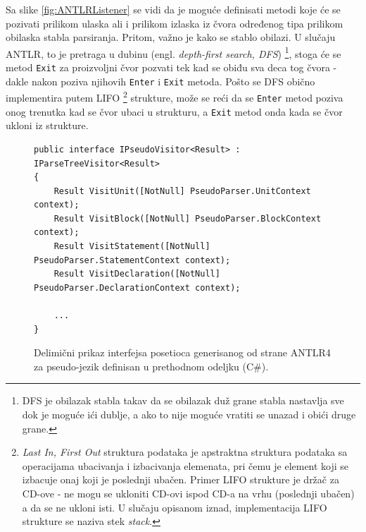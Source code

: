 Sa slike \ref{fig:ANTLRListener} se vidi da je moguće definisati metodi koje će se pozivati prilikom ulaska ali i prilikom izlaska iz čvora određenog tipa prilikom obilaska stabla parsiranja. Pritom, važno je kako se stablo obilazi. U slučaju ANTLR, to je pretraga u dubinu (engl. \emph{depth-first search, DFS}) \footnote{DFS je obilazak stabla takav da se obilazak duž grane stabla nastavlja sve dok je moguće ići dublje, a ako to nije moguće vratiti se unazad i obići druge grane.}, stoga će se metod \texttt{Exit} za proizvoljni čvor pozvati tek kad se obiđu sva deca tog čvora - dakle nakon poziva njihovih \texttt{Enter} i \texttt{Exit} metoda. Pošto se DFS obično implementira putem LIFO \footnote{\emph{Last In, First Out} struktura podataka je apstraktna struktura podataka sa operacijama ubacivanja i izbacivanja elemenata, pri čemu je element koji se izbacuje onaj koji je poslednji ubačen. Primer LIFO strukture je držač za CD-ove - ne mogu se ukloniti CD-ovi ispod CD-a na vrhu (poslednji ubačen) a da se ne ukloni isti. U slučaju opisanom iznad, implementacija LIFO strukture se naziva stek \emph{stack}.} strukture, može se reći da se \texttt{Enter} metod poziva onog trenutka kad se čvor ubaci u strukturu, a \texttt{Exit} metod onda kada se čvor ukloni iz strukture.

\begin{figure}[h!]
\begin{lstlisting}
public interface IPseudoVisitor<Result> : IParseTreeVisitor<Result>
{
    Result VisitUnit([NotNull] PseudoParser.UnitContext context);
    Result VisitBlock([NotNull] PseudoParser.BlockContext context);
    Result VisitStatement([NotNull] PseudoParser.StatementContext context);
    Result VisitDeclaration([NotNull] PseudoParser.DeclarationContext context);
    
    ...
}
\end{lstlisting}
\caption{Delimični prikaz interfejsa posetioca generisanog od strane ANTLR4 za pseudo-jezik definisan u prethodnom odeljku (C\#).}
\label{fig:ANTLRVisitor}
\end{figure}

